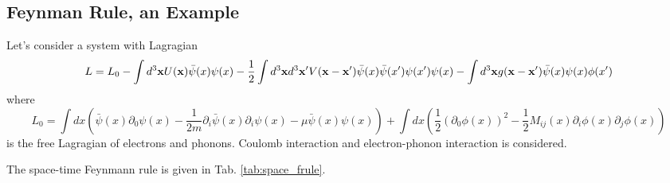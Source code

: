 \documentclass[12pt]{book}
\begin{document}
	\subsection{Feynman Rule, an Example}
	
	Let's consider a system with Lagragian
	\begin{equation}
		L=L_0-\int d^3{\bf x}U({\bf x})\bar\psi(x)\psi(x)-\frac 12\int d^3{\bf x}d^3{\bf x'}V({\bf x}-{\bf x'})\bar\psi(x)\bar\psi(x')\psi(x')\psi(x)-\int d^3{\bf x} g({\bf x}-{\bf x'})\bar\psi(x)\psi(x)\phi(x')
	\end{equation}
	where
	\begin{equation}
		L_0=\int dx(\bar\psi(x)\partial_0\psi(x)-\frac 1{2m}\partial_i\bar\psi(x)\partial_i\psi(x)-\mu\bar\psi(x)\psi(x))+\int dx(\frac 12(\partial_0\phi(x))^2-\frac 12 M_{ij}(x)\partial_i\phi(x)\partial_j\phi(x))
	\end{equation}
	is the free Lagragian of electrons and phonons. Coulomb interaction and electron-phonon interaction is considered.
	
	The space-time Feynmann rule is given in Tab. \ref{tab:space_frule}.
	
\end{document}
